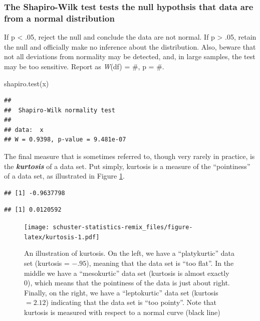 \documentclass[
]{book}
\newenvironment{Shaded}{\begin{snugshade}}{\end{snugshade}}
\newcommand{\FunctionTok}[1]{\textcolor[rgb]{0.00,0.00,0.00}{#1}}
\newcommand{\NormalTok}[1]{#1}
\begin{document}
\hypertarget{the-shapiro-wilk-test-tests-the-null-hypothsis-that-data-are-from-a-normal-distribution}{%
\subsubsection{The Shapiro-Wilk test tests the null hypothsis that data are from a normal distribution}\label{the-shapiro-wilk-test-tests-the-null-hypothsis-that-data-are-from-a-normal-distribution}}

If p \textless{} .05, reject the null and conclude the data are not normal. If p \textgreater{} .05, retain the null and officially make no inference about the distribution. Also, beware that not all deviations from normality may be detected, and, in large samples, the test may be too sensitive. Report as \emph{W}(df) = \#, p = \#.

\begin{Shaded}
\begin{Highlighting}[]
\FunctionTok{shapiro.test}\NormalTok{(x) }
\end{Highlighting}
\end{Shaded}

\begin{verbatim}
## 
##  Shapiro-Wilk normality test
## 
## data:  x
## W = 0.9398, p-value = 9.481e-07
\end{verbatim}

The final measure that is sometimes referred to, though very rarely in practice, is the \textbf{\emph{kurtosis}} of a data set. Put simply, kurtosis is a measure of the ``pointiness'' of a data set, as illustrated in Figure \ref{fig:kurtosis}.

\begin{verbatim}
## [1] -0.9637798
\end{verbatim}

\begin{verbatim}
## [1] 0.0120592
\end{verbatim}

\begin{figure}
\centering
\texttt{[image: schuster-statistics-remix\_files/figure-latex/kurtosis-1.pdf]}
\caption{\label{fig:kurtosis}An illustration of kurtosis. On the left, we have a ``platykurtic'' data set (kurtosis = \(-.95\)), meaning that the data set is ``too flat''. In the middle we have a ``mesokurtic'' data set (kurtosis is almost exactly 0), which means that the pointiness of the data is just about right. Finally, on the right, we have a ``leptokurtic'' data set (kurtosis \(= 2.12\)) indicating that the data set is ``too pointy''. Note that kurtosis is measured with respect to a normal curve (black line)}
\end{figure}
\end{document}
